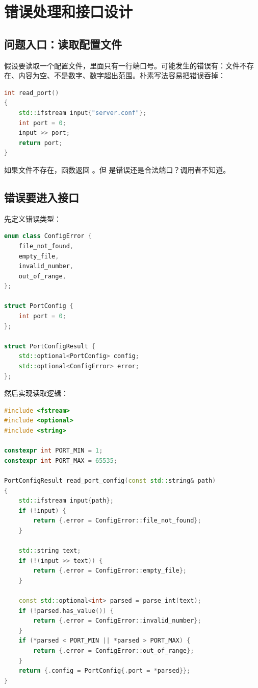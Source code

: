 \chapter{错误处理和接口设计}

\section{问题入口：读取配置文件}

假设要读取一个配置文件，里面只有一行端口号。可能发生的错误有：文件不存在、内容为空、不是数字、数字超出范围。朴素写法容易把错误吞掉：

\begin{lstlisting}[language=C++,caption={吞掉错误的读取函数}]
int read_port()
{
    std::ifstream input{"server.conf"};
    int port = 0;
    input >> port;
    return port;
}
\end{lstlisting}

如果文件不存在，函数返回 。但  是错误还是合法端口？调用者不知道。

\section{错误要进入接口}

先定义错误类型：

\begin{lstlisting}[language=C++,caption={配置读取错误}]
enum class ConfigError {
    file_not_found,
    empty_file,
    invalid_number,
    out_of_range,
};

struct PortConfig {
    int port = 0;
};

struct PortConfigResult {
    std::optional<PortConfig> config;
    std::optional<ConfigError> error;
};
\end{lstlisting}

然后实现读取逻辑：

\begin{lstlisting}[language=C++,caption={显式返回错误}]
#include <fstream>
#include <optional>
#include <string>

constexpr int PORT_MIN = 1;
constexpr int PORT_MAX = 65535;

PortConfigResult read_port_config(const std::string& path)
{
    std::ifstream input{path};
    if (!input) {
        return {.error = ConfigError::file_not_found};
    }

    std::string text;
    if (!(input >> text)) {
        return {.error = ConfigError::empty_file};
    }

    const std::optional<int> parsed = parse_int(text);
    if (!parsed.has_value()) {
        return {.error = ConfigError::invalid_number};
    }
    if (*parsed < PORT_MIN || *parsed > PORT_MAX) {
        return {.error = ConfigError::out_of_range};
    }
    return {.config = PortConfig{.port = *parsed}};
}
\end{lstlisting}

